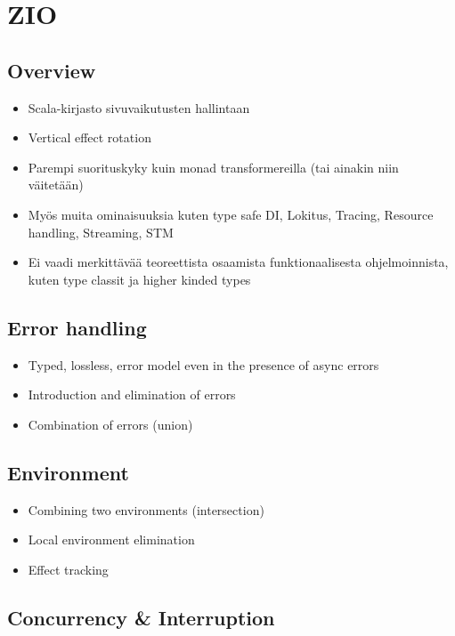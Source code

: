 \chapter{ZIO} \label{zio}
\section{Overview}
\begin{itemize}
    \item Scala-kirjasto sivuvaikutusten hallintaan
    \item Vertical effect rotation
    \item Parempi suorituskyky kuin monad transformereilla (tai ainakin niin väitetään)
    \item Myös muita ominaisuuksia kuten type safe DI, Lokitus, Tracing, Resource handling, Streaming, STM
    \item Ei vaadi merkittävää teoreettista osaamista funktionaalisesta ohjelmoinnista, kuten type classit ja higher kinded types %
\end{itemize}

\section{Error handling}
\begin{itemize}
    \item Typed, lossless, error model even in the presence of async errors
    \item Introduction and elimination of errors
    \item Combination of errors (union)
\end{itemize}

\section{Environment}
\begin{itemize}
    \item Combining two environments (intersection)
    \item Local environment elimination
    \item Effect tracking
\end{itemize}

\section{Concurrency \& Interruption}

